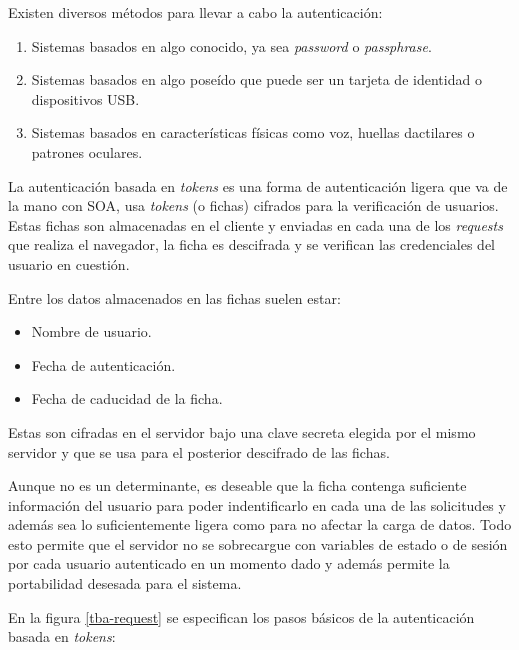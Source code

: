     Existen diversos métodos para llevar a cabo la autenticación\cite{AUTENTICACION-aplicaciones}:
    
    \begin{enumerate}
        \item Sistemas basados en algo conocido, ya sea \textit{password} o \textit{passphrase}.
        \item Sistemas basados en algo poseído que puede ser un tarjeta de identidad o dispositivos USB.
        \item Sistemas basados en características físicas como voz, huellas dactilares o patrones oculares.
    \end{enumerate}
    
    La autenticación basada en \textit{tokens} es una forma de autenticación ligera que va de la mano con SOA, usa \textit{tokens} (o fichas) cifrados para la verificación de usuarios. Estas fichas son almacenadas en el cliente y enviadas en cada una de los \textit{requests} que realiza el navegador, la ficha es descifrada y se verifican las credenciales del usuario en cuestión\cite{TOKEN-tokenbasedauth}.
    
    Entre los datos almacenados en las fichas suelen estar:
    
    \begin{itemize}
        \item Nombre de usuario.
        \item Fecha de autenticación.
        \item Fecha de caducidad de la ficha.
    \end{itemize}

    Estas son cifradas en el servidor bajo una clave secreta elegida por el mismo servidor y que se usa para el posterior descifrado de las fichas.
    
    Aunque no es un determinante, es deseable que la ficha contenga suficiente información del usuario para poder indentificarlo en cada una de las solicitudes y además sea lo suficientemente ligera como para no afectar la carga de datos. Todo esto permite que el servidor no se sobrecargue con variables de estado o de sesión por cada usuario autenticado en un momento dado y además permite la portabilidad desesada para el sistema.
    
    En la figura \ref{tba-request} se especifican los pasos básicos de la autenticación basada en \textit{tokens}:%
    
